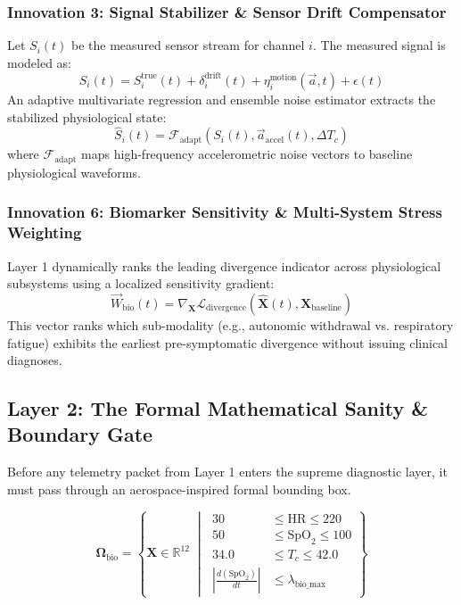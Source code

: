 \documentclass[11pt,a4paper]{article}
\begin{document}
\subsubsection{Innovation 3: Signal Stabilizer \& Sensor Drift Compensator}
Let $S_i(t)$ be the measured sensor stream for channel $i$. The measured signal is modeled as:
\begin{equation}
S_i(t) = S_i^{\text{true}}(t) + \delta_i^{\text{drift}}(t) + \eta_i^{\text{motion}}(\vec{a}, t) + \epsilon(t)
\end{equation}
An adaptive multivariate regression and ensemble noise estimator extracts the stabilized physiological state:
\begin{equation}
\hat{S}_i(t) = \mathcal{F}_{\text{adapt}}\left(S_i(t), \vec{a}_{\text{accel}}(t), \Delta T_c\right)
\end{equation}
where $\mathcal{F}_{\text{adapt}}$ maps high-frequency accelerometric noise vectors to baseline physiological waveforms.

\subsubsection{Innovation 6: Biomarker Sensitivity \& Multi-System Stress Weighting}
Layer 1 dynamically ranks the leading divergence indicator across physiological subsystems using a localized sensitivity gradient:
\begin{equation}
\vec{W}_{\text{bio}}(t) = \nabla_{\mathbf{X}} \mathcal{L}_{\text{divergence}}\left(\hat{\mathbf{X}}(t), \mathbf{X}_{\text{baseline}}\right)
\end{equation}
This vector ranks which sub-modality (e.g., autonomic withdrawal vs. respiratory fatigue) exhibits the earliest pre-symptomatic divergence without issuing clinical diagnoses.

\subsection{Layer 2: The Formal Mathematical Sanity \& Boundary Gate}
Before any telemetry packet from Layer 1 enters the supreme diagnostic layer, it must pass through an aerospace-inspired formal bounding box.

\begin{equation}
\mathbf{\Omega}_{\text{bio}} = \left\{ \mathbf{X} \in \mathbb{R}^{12} \; \middle| \;
\begin{aligned}
30 &\le \text{HR} \le 220 \\
50 &\le \text{SpO}_2 \le 100 \\
34.0 &\le T_c \le 42.0 \\
\left| \frac{d(\text{SpO}_2)}{dt} \right| &\le \lambda_{\text{bio\_max}}
\end{aligned}
\right\}
\end{equation}
\end{document}

